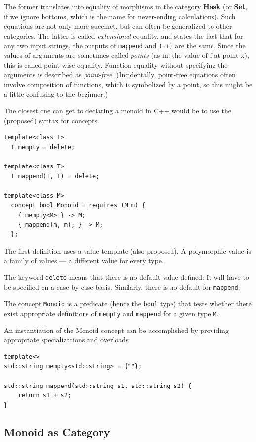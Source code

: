 The former translates into equality of morphisms in the category
\textbf{Hask} (or \textbf{Set}, if we ignore bottoms, which is the name
for never-ending calculations). Such equations are not only more
succinct, but can often be generalized to other categories. The latter
is called \emph{extensional} equality, and states the fact that for any
two input strings, the outputs of \texttt{mappend} and \texttt{(++)} are
the same. Since the values of arguments are sometimes called
\emph{points} (as in: the value of f at point x), this is called
point-wise equality. Function equality without specifying the arguments
is described as \emph{point-free}. (Incidentally, point-free equations
often involve composition of functions, which is symbolized by a point,
so this might be a little confusing to the beginner.)

The closest one can get to declaring a monoid in C++ would be to use the
(proposed) syntax for concepts.

\begin{verbatim}
template<class T>
  T mempty = delete;
  
template<class T>
  T mappend(T, T) = delete;
  
template<class M> 
  concept bool Monoid = requires (M m) { 
    { mempty<M> } -> M; 
    { mappend(m, m); } -> M;
  };
\end{verbatim}


The first definition uses a value template (also proposed). A
polymorphic value is a family of values --- a different value for every
type.

The keyword \texttt{delete} means that there is no default value
defined: It will have to be specified on a case-by-case basis.
Similarly, there is no default for \texttt{mappend}.

The concept \texttt{Monoid} is a predicate (hence the \texttt{bool}
type) that tests whether there exist appropriate definitions of
\texttt{mempty} and \texttt{mappend} for a given type \texttt{M}.

An instantiation of the Monoid concept can be accomplished by providing
appropriate specializations and overloads:

\begin{verbatim}
template<>
std::string mempty<std::string> = {""};

std::string mappend(std::string s1, std::string s2) { 
    return s1 + s2;
}
\end{verbatim}

\subsection{Monoid as Category}\label{monoid-as-category}

